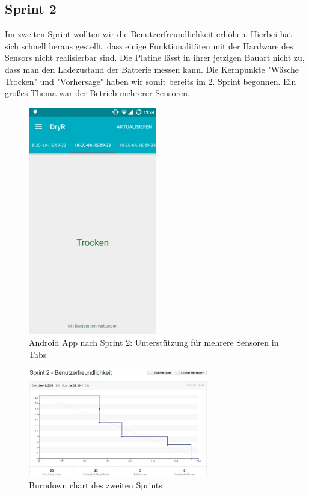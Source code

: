\subsection{Sprint 2}
Im zweiten Sprint wollten wir die Benutzerfreundlichkeit erhöhen.
Hierbei hat sich schnell heraus gestellt, dass einige Funktionalitäten mit der Hardware des Sensors nicht realisierbar sind. Die Platine lässt in ihrer jetzigen Bauart nicht zu, dass man den Ladezustand der Batterie messen kann. Die Kernpunkte "Wäsche Trocken" und "Vorhersage" haben wir somit bereits im 2. Sprint begonnen. Ein großes Thema war der Betrieb mehrerer Sensoren.
\begin{figure}[htb] 
	\centerline{\includegraphics[width=0.5\textwidth]{laundry_status_multiple_sensors.png}}
	\caption{Android App nach Sprint 2: Unterstützung für mehrere Sensoren in Tabs}
	\label{screenshot_sprint_2_laundry_status}
\end{figure}
\begin{figure}[htb] 
	\centerline{\includegraphics[width=0.7\textwidth]{burndown_sprint2.jpg}}
	\caption{Burndown chart des zweiten Sprints}
	\label{screenshot_sprint_2_burndown}
\end{figure}
\clearpage

